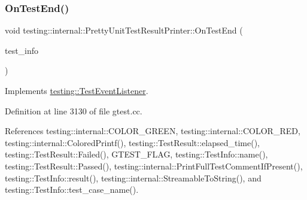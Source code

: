 \subsubsection{\texorpdfstring{On\+Test\+End()}{OnTestEnd()}}
{\footnotesize\ttfamily void testing\+::internal\+::\+Pretty\+Unit\+Test\+Result\+Printer\+::\+On\+Test\+End (\begin{DoxyParamCaption}\item[{const \hyperlink{classtesting_1_1TestInfo}{Test\+Info} \&}]{test\+\_\+info }\end{DoxyParamCaption})\hspace{0.3cm}{\ttfamily [virtual]}}



Implements \hyperlink{classtesting_1_1TestEventListener_abb1c44525ef038500608b5dc2f17099b}{testing\+::\+Test\+Event\+Listener}.



Definition at line 3130 of file gtest.\+cc.



References testing\+::internal\+::\+C\+O\+L\+O\+R\+\_\+\+G\+R\+E\+EN, testing\+::internal\+::\+C\+O\+L\+O\+R\+\_\+\+R\+ED, testing\+::internal\+::\+Colored\+Printf(), testing\+::\+Test\+Result\+::elapsed\+\_\+time(), testing\+::\+Test\+Result\+::\+Failed(), G\+T\+E\+S\+T\+\_\+\+F\+L\+AG, testing\+::\+Test\+Info\+::name(), testing\+::\+Test\+Result\+::\+Passed(), testing\+::internal\+::\+Print\+Full\+Test\+Comment\+If\+Present(), testing\+::\+Test\+Info\+::result(), testing\+::internal\+::\+Streamable\+To\+String(), and testing\+::\+Test\+Info\+::test\+\_\+case\+\_\+name().


